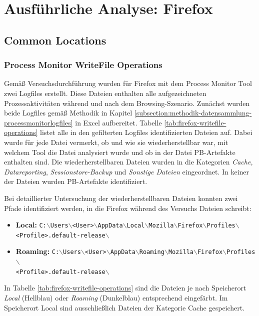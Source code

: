 \begin{appendices}
\begin{landscape}
\end{landscape}
\restoregeometry

\section{Ausführliche Analyse: Firefox}\label{section:appendix-firefox}
\subsection{Common Locations}
\label{subsection:appendix-firefox-common-locations}
\subsubsection*{Process Monitor WriteFile Operations}
\label{subsubsection:appendix-firefox-common-locations-writefile-operations}
Gemäß Versuchsdurchführung wurden für Firefox mit dem Process Monitor Tool zwei Logfiles erstellt. Diese Dateien enthalten alle aufgezeichneten Prozessaktivitäten während und nach dem Browsing-Szenario.
Zunächst wurden beide Logfiles gemäß Methodik in Kapitel \ref{subsection:methodik-datensammlung-processmonitorlogfiles} in Excel aufbereitet. Tabelle \ref{tab:firefox-writefile-operations} listet alle in den gefilterten Logfiles identifizierten Dateien auf. Dabei wurde für jede Datei vermerkt, ob und wie sie wiederherstellbar war, mit welchem Tool die Datei analysiert wurde und ob in der Datei PB-Artefakte enthalten sind. Die wiederherstellbaren Dateien wurden in die Kategorien \textit{Cache}, \textit{Datareporting}, \textit{Sessionstore-Backup} und \textit{Sonstige Dateien} eingeordnet. In keiner der Dateien wurden PB-Artefakte identifiziert.

Bei detaillierter Untersuchung der wiederherstellbaren Dateien konnten zwei Pfade identifiziert werden, in die Firefox während des Versuchs Dateien schreibt: 
\begin{itemize}
\item \textbf{Local:} \texttt{C:$\backslash$Users$\backslash$<User>$\backslash$AppData$\backslash$Local$\backslash$Mozilla$\backslash$Firefox$\backslash$Profiles$\backslash$\\<Profile>.default-release$\backslash$}
\item \textbf{Roaming:} \texttt{C:$\backslash$Users$\backslash$<User>$\backslash$AppData$\backslash$Roaming$\backslash$Mozilla$\backslash$Firefox$\backslash$Profiles$\backslash$\\<Profile>.default-release$\backslash$}
\end{itemize}
In Tabelle 	\ref{tab:firefox-writefile-operations} sind die Dateien je nach Speicherort \textit{Local} (Hellblau) oder \textit{Roaming} (Dunkelblau) entsprechend eingefärbt. Im Speicherort Local sind ausschließlich Dateien der Kategorie \glqq{}Cache\grqq{} gespeichert.


\end{appendices}
